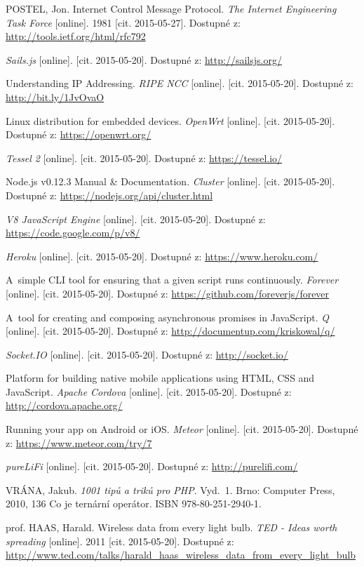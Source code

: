 \documentclass[oneside,12pt,a4paper,final]{book} %
\begin{document}
\begin{thebibliography}{99}
POSTEL, Jon. Internet Control Message Protocol. \textit{The Internet Engineering Task Force} [online]. 1981 [cit. 2015-05-27]. Dostupné z: \url{http://tools.ietf.org/html/rfc792}

\textit{Sails.js} [online]. [cit. 2015-05-20]. Dostupné z: \url{http://sailsjs.org/}

Understanding IP Addressing. \textit{RIPE NCC} [online]. [cit. 2015-05-20]. Dostupné z: \url{http://bit.ly/1JvOvaO}

Linux distribution for embedded devices. \textit{OpenWrt} [online]. [cit. 2015-05-20]. Dostupné z: \url{https://openwrt.org/}

\textit{Tessel 2} [online]. [cit. 2015-05-20]. Dostupné z: \url{https://tessel.io/}

Node.js v0.12.3 Manual \& Documentation. \textit{Cluster} [online]. [cit. 2015-05-20]. Dostupné z: \url{https://nodejs.org/api/cluster.html}

\textit{V8 JavaScript Engine} [online]. [cit. 2015-05-20]. Dostupné z: \url{https://code.google.com/p/v8/}

\textit{Heroku} [online]. [cit. 2015-05-20]. Dostupné z: \url{https://www.heroku.com/}

A~simple CLI tool for ensuring that a given script runs continuously. \textit{Forever} [online]. [cit. 2015-05-20]. Dostupné z: \url{https://github.com/foreverjs/forever}

A~tool for creating and composing asynchronous promises in JavaScript. \textit{Q} [online]. [cit. 2015-05-20]. Dostupné z: \url{http://documentup.com/kriskowal/q/}

\textit{Socket.IO} [online]. [cit. 2015-05-20]. Dostupné z: \url{http://socket.io/}

Platform for building native mobile applications using HTML, CSS and JavaScript. \textit{Apache Cordova} [online]. [cit. 2015-05-20]. Dostupné z: \url{http://cordova.apache.org/}

Running your app on Android or iOS. \textit{Meteor} [online]. [cit. 2015-05-20]. Dostupné z: \url{https://www.meteor.com/try/7}

\textit{pureLiFi} [online]. [cit. 2015-05-20]. Dostupné z: \url{http://purelifi.com/}

VRÁNA, Jakub. \textit{1001 tipů a triků pro PHP}. Vyd.~1. Brno: Computer Press, 2010, 136 Co je ternární operátor. ISBN 978-80-251-2940-1.

prof. HAAS, Harald. Wireless data from every light bulb. \textit{TED - Ideas worth spreading} [online]. 2011 [cit. 2015-05-20]. Dostupné z: \url{http://www.ted.com/talks/harald_haas_wireless_data_from_every_light_bulb}

\end{thebibliography}

\printindex
\end{document}
